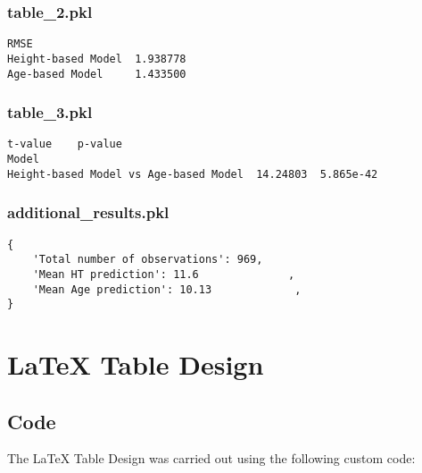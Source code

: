 \documentclass[11pt]{article}
\begin{document}
\subsubsection*{table\_2.pkl}

\begin{Verbatim}[tabsize=4]
                        RMSE
Height-based Model  1.938778
Age-based Model     1.433500
\end{Verbatim}

\subsubsection*{table\_3.pkl}

\begin{Verbatim}[tabsize=4]
                                        t-value    p-value
Model
Height-based Model vs Age-based Model  14.24803  5.865e-42
\end{Verbatim}

\subsubsection*{additional\_results.pkl}

\begin{Verbatim}[tabsize=4]
{
    'Total number of observations': 969,
    'Mean HT prediction': 11.6              ,
    'Mean Age prediction': 10.13             ,
}
\end{Verbatim}

\section{LaTeX Table Design}
\subsection{{Code}}
The LaTeX Table Design was carried out using the following custom code:
\end{document}
